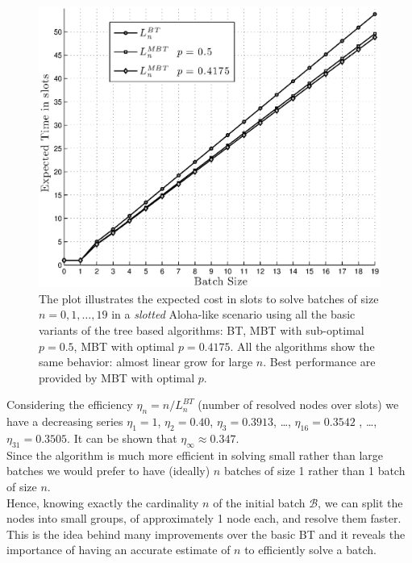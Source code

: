 \documentclass[12pt,a4paper]{report}
\begin{document}
\begin{figure}[H]
\begin{center}
\includegraphics[scale=.7]{matlab/BTs/bin-trees-expected-time}
\caption[Expected cost for tree algorithms in \emph{slotted-ALOHA} scenario]{The plot illustrates the expected cost in slots to solve batches of size $n=0,1,\ldots,19$ in a \emph{slotted} Aloha-like scenario using all the basic variants of the tree based algorithms: BT, MBT with sub-optimal $p=0.5$, MBT with optimal $p=0.4175$. All the algorithms show the same behavior: almost linear grow for large $n$. Best performance are provided by MBT with optimal $p$.}
\label{fig:BTs performances}
\end{center}
\end{figure}

Considering the efficiency $\eta_{n}=n/L_{n}^{BT}$ (number of resolved nodes over slots) we have a decreasing series $\eta_{1}=1$, $\eta_{2}=0.40$, $\eta_{3}=0.3913$, \dots, $\eta_{16}=0.3542$ , \dots, $\eta_{31}=0.3505$. It can be shown \cite{capetanakis} that $\eta_{\infty} \approx 0.347$.\\

Since the algorithm is much more efficient in solving small rather than large batches we would prefer to have (ideally)  $n$ batches of size 1 rather than 1 batch of size $n$.\\
Hence, knowing exactly the cardinality $n$ of the initial batch $\mathcal{B}$, we can split the nodes into small groups, of approximately 1 node each, and resolve them faster. \\This is the idea behind many improvements over the basic BT and it reveals the importance of having an accurate estimate of $n$ to efficiently solve a batch.
\end{document}
